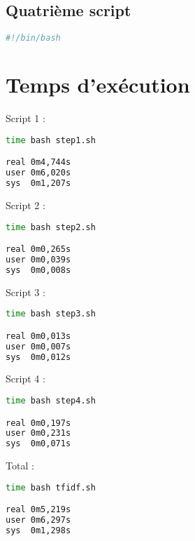 \documentclass{article}
\begin{document}
\subsection{Quatrième script}

\begin{lstlisting}[language=bash,caption={Script n1}]
#!/bin/bash

\end{lstlisting}

\section{Temps d'exécution}

Script 1 :

\begin{lstlisting}[language=bash,caption={Temps d'exécution du script 1}]
time bash step1.sh

real 0m4,744s
user 0m6,020s
sys  0m1,207s

\end{lstlisting}

Script 2 :

\begin{lstlisting}[language=bash,caption={Temps d'exécution du script 2}]
time bash step2.sh

real 0m0,265s
user 0m0,039s
sys  0m0,008s

\end{lstlisting}

Script 3 :

\begin{lstlisting}[language=bash,caption={Temps d'exécution du script 3}]
time bash step3.sh

real 0m0,013s
user 0m0,007s
sys  0m0,012s
\end{lstlisting}

Script 4 :

\begin{lstlisting}[language=bash,caption={Temps d'exécution du script 4}]
time bash step4.sh

real 0m0,197s
user 0m0,231s
sys  0m0,071s

\end{lstlisting}

Total :

\begin{lstlisting}[language=bash,caption={Temps d'exécution en tout}]
time bash tfidf.sh

real 0m5,219s
user 0m6,297s
sys  0m1,298s

\end{lstlisting}
\end{document}
